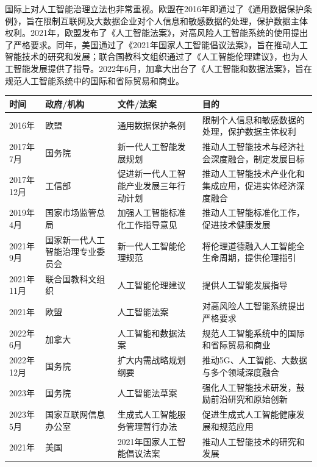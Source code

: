 国际上对人工智能治理立法也非常重视。欧盟在2016年即通过了《通用数据保护条例》，旨在限制互联网及大数据企业对个人信息和敏感数据的处理，保护数据主体权利。2021年，欧盟发布了《人工智能法案》，对高风险人工智能系统的使用提出了严格要求。同年，美国通过了《2021年国家人工智能倡议法案》，旨在推动人工智能技术的研究和发展；联合国教科文组织通过了《人工智能伦理建议》，也为人工智能发展提供了指导。2022年6月，加拿大出台了《人工智能和数据法案》，旨在规范人工智能系统中的国际和省际贸易和商业。

\begin{table}[htbp]
\begin{tabular}{p{3cm}|p{2.5cm}|p{4.3cm}|p{5cm}}
\hline
\textbf{时间} & \textbf{政府/机构} & \textbf{文件/法案} & \textbf{目的} \\
\hline
2016年 & 欧盟 & 通用数据保护条例 & 限制个人信息和敏感数据的处理，保护数据主体权利 \\
\hline
2017年7月 & 国务院 & 新一代人工智能发展规划 & 推动人工智能技术与经济社会深度融合，制定发展目标 \\
\hline
2017年12月 & 工信部 & 促进新一代人工智能产业发展三年行动计划 & 推动人工智能技术产业化和集成应用，促进实体经济深度融合 \\
\hline
2019年4月 & 国家市场监管总局 & 加强人工智能标准化工作指导意见 & 推动人工智能标准化工作，促进技术健康发展 \\
\hline
2021年9月 & 国家新一代人工智能治理专业委员会 & 新一代人工智能伦理规范 & 将伦理道德融入人工智能全生命周期，提供伦理指引 \\
\hline
2021年11月 & 联合国教科文组织 & 人工智能伦理建议 & 提供人工智能发展指导 \\
\hline
2021年 & 欧盟 & 人工智能法案 & 对高风险人工智能系统提出严格要求 \\
\hline
2022年6月 & 加拿大 & 人工智能和数据法案 & 规范人工智能系统中的国际和省际贸易和商业 \\
\hline
2022年12月 & 国务院 & 扩大内需战略规划纲要 & 推动5G、人工智能、大数据与多个领域深度融合 \\
\hline
2023年 & 国务院 & 人工智能法草案 & 强化人工智能技术研发，鼓励前沿研究和原始创新 \\
\hline
2023年5月 & 国家互联网信息办公室 & 生成式人工智能服务管理暂行办法 & 促进生成式人工智能健康发展和规范应用 \\
\hline
2021年 & 美国 & 2021年国家人工智能倡议法案 & 推动人工智能技术的研究和发展 \\
\hline
\end{tabular}
\end{table}


